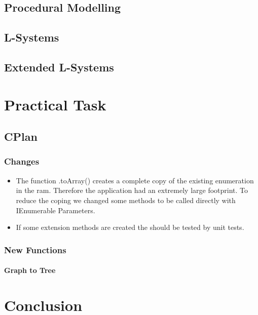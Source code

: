 \documentclass[11pt, a4paper]{report}
\begin{document}
\pagebreak
\section{Procedural Modelling}

\pagebreak
\section{L-Systems}

\pagebreak
\section{Extended L-Systems}

\pagebreak
\chapter{Practical Task}
\section{CPlan}
\subsection{Changes}
\begin{itemize}
    \item The function .toArray() creates a complete copy of the existing enumeration in the ram. Therefore the application had an extremely large footprint. To reduce the coping we changed some methods to be called directly with IEnumerable Parameters.
    \item If some extension methods are created the should be tested by unit tests.
     
\end{itemize}


\subsection{New Functions}
\subsubsection{Graph to Tree}


\chapter{Conclusion}


\appendix
\glsaddall
\printglossaries
\end{document}
